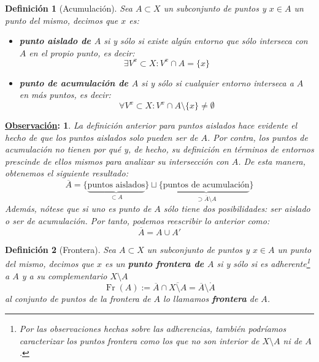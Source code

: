\documentclass[10pt,a4paper,openright]{book}
\theoremstyle{break}
\newtheorem*{defi}{Definición}
\newtheorem*{obs}{\underline{Observación}:}
\DeclareMathOperator{\fr}{Fr}
\begin{document}
\begin{defi}[Acumulación]    
Sea $A\subset X$ un subconjunto de puntos y $x\in A$ un punto del mismo, decimos que $x$ es:
\begin{itemize}
\item \textbf{punto aislado de $A$} si y sólo si existe algún entorno que sólo interseca con $A$ en el propio punto, es decir:
$$
\exists V^x \subset X : V^x \cap A = \{x\}
$$
\item \textbf{punto de acumulación de $A$} si y sólo si cualquier entorno interseca a $A$ en más puntos, es decir:
$$
\forall V^x \subset X : V^x \cap A \setminus \{x\} \neq \emptyset
$$
\end{itemize}
\end{defi}

\begin{obs}
La definición anterior para puntos aislados hace evidente el hecho de que los puntos aislados solo pueden ser de $A$. Por contra, los puntos de acumulación no tienen por qué y, de hecho, su definición en términos de entornos prescinde de ellos mismos para analizar su intersección con $A$. De esta manera, obtenemos el siguiente resultado:
$$
\overline{A} = \{\underbrace{\text{puntos aislados}}_{\subset A}\} \sqcup \{\underbrace{\text{puntos de acumulación}}_{\supset \overline{A} \setminus A}\}
$$
Además, nótese que si uno es punto de $A$ sólo tiene dos posibilidades: ser aislado o ser de acumulación. Por tanto, podemos reescribir lo anterior como:
$$
\overline{A} = A \cup A'
$$
\end{obs}

\begin{defi}[Frontera]
Sea $A\subset X$ un subconjunto de puntos y $x\in A$ un punto del mismo, decimos que $x$ es un \textbf{punto frontera de $A$} si y sólo si es adherente\footnote{Por las observaciones hechas sobre las adherencias, también podríamos caracterizar los puntos frontera como los que no son interior de $X \setminus A$ ni de $A$.} a $A$ y a su complementario $X \setminus A$
    \[
    \fr\left( A \right) := \overline{A} \cap \overline{X \setminus A} = \overline{A} \setminus \mathring{A}     
    \]
al conjunto de puntos de la frontera de $A$ lo llamamos \textbf{frontera} de $A$.
\end{defi}
\end{document}
